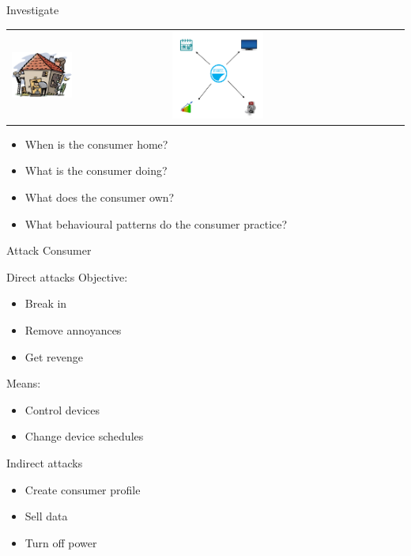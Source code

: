 \begin{frame}{Investigate}

\begin{tabular}{l l}

  \includegraphics[width=0.4\textwidth]{graphics/hus.jpg}
&
\includegraphics[width=0.4\textwidth]{graphics/smartmeterdata.png}
\end{tabular}

     \begin{itemize}
        \item When is the consumer home?
        \item What is the consumer doing?
        \item What does the consumer own?
        \item What behavioural patterns do the consumer practice?
      \end{itemize}
\end{frame}

\begin{frame}{Attack Consumer}
    \begin{block}{Direct attacks}
      Objective:
      \begin{itemize}
        \item Break in
        \item Remove annoyances
        \item Get revenge
      \end{itemize}
      Means:
      \begin{itemize}
        \item Control devices
        \item Change device schedules
      \end{itemize}
    \end{block}

  \begin{block}{Indirect attacks}
    \begin{itemize}
      \item Create consumer profile
      \item Sell data
      \item Turn off power
    \end{itemize}
  \end{block}
\end{frame}

